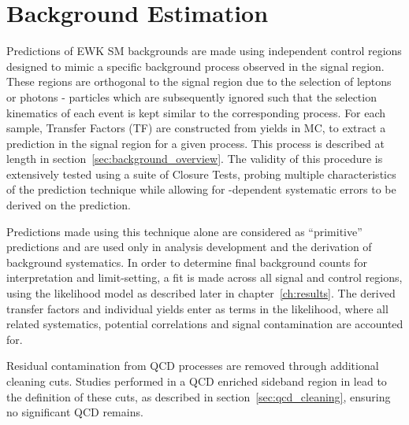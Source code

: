 \chapter{Background Estimation}
\label{ch:background}

\ifpdf
    \graphicspath{{Chapter6/Figs/Raster/}{Chapter6/Figs/PDF/}{Chapter6/Figs/}}
\else
    \graphicspath{{Chapter6/Figs/Vector/}{Chapter6/Figs/}}
\fi

Predictions of EWK SM backgrounds are made using independent control regions
designed to mimic a specific background process observed in the signal region.
These regions are orthogonal to the signal region due to the
selection of leptons or photons - particles which are subsequently ignored such 
that the selection kinematics of each event is kept similar to the corresponding
process. For each sample, Transfer Factors (TF) are 
constructed from yields in MC, to extract a prediction in the signal 
region for a given process. This process is described at length in
section~\ref{sec:background_overview}. The validity of this procedure is
extensively tested using a suite of Closure Tests, probing multiple
characteristics of the prediction technique while allowing for \HT-dependent
systematic errors to be derived on the prediction.

Predictions made using this technique alone are considered as ``primitive'' 
predictions and are used only in analysis development and the derivation of 
background systematics. In order to determine final background counts for
interpretation and
limit-setting, a fit is made across all signal and control regions, using the 
likelihood model as described later in chapter~\ref{ch:results}. The derived 
transfer factors and individual yields enter as terms in the likelihood, where 
all related systematics, potential correlations and signal contamination are
accounted for.

Residual contamination from QCD processes are removed through additional
cleaning cuts. Studies performed in a QCD enriched sideband region in \alphat
lead to the definition of these cuts, as described in
section~\ref{sec:qcd_cleaning}, ensuring no significant QCD remains.


